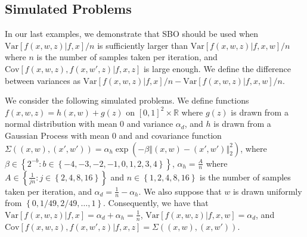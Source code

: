 \documentclass{article}
\newcommand{\w}{w}
\newcommand{\z}{z}
\begin{document}
\subsection{Simulated Problems}
\label{sec:GPexample}

In our last examples, we demonstrate that SBO should be used when $\mbox{Var}\left[f\left(x,\w,\z\right)|f,x\right]/n$ is sufficiently larger than $\mbox{Var}\left[f\left(x,\w,\z\right)|f,x,\w\right]/n$ where $n$ is the number of samples taken per iteration, and $\mbox{Cov}\left[f\left(x,\w,\z\right),f\left(x,\w',\z\right)|f,x,z\right]$ is large enough. We define the difference between variances as $\mbox{Var}\left[f\left(x,\w,\z\right)|f,x\right]/n - \mbox{Var}\left[f\left(x,\w,\z\right)|f,x,\w\right]/n$.

We consider the following simulated problems. We define functions $f(x,\w,\z)=h(x,\w)+g(\z)$ on $\left[0,1\right]^{2}\times\mathbb{R}$ where $g(z)$ is drawn from a normal distribution with mean $0$ and variance $\alpha_{d}$, and $h$ is drawn from a Gaussian Process with mean $0$ and and covariance function $\Sigma\left(\left(x,\w\right),\left(x',\w'\right)\right)=\alpha_{h}\exp\left(-\beta\left\Vert \left(x,\w\right)-\left(x',\w'\right)\right\Vert _{2}^{2}\right)$, where $\beta\in\left\{ 2^{-b}:b\in\left\{ -4,-3,-2,-1,0,1,2,3,4\right\} \right\} $, $\alpha_{h}=\frac{A}{n}$ where $A\in\left\{ \frac{1}{jn}:j\in\left\{ 2,4,8,16\right\} \right\} $ and $n\in\left\{ 1,2,4,8,16\right\} $ is the number of samples taken per iteration, and $\alpha_{d}=\frac{1}{n}-\alpha_{h}$. We also suppose that 
$\w$ is drawn uniformly from $\left\{ 0,1/49,2/49,\ldots,1\right\} $. Consequently, we have that $\mbox{Var}\left[f\left(x,\w,\z\right)|f,x\right]=\alpha_{d}+\alpha_{h}=\frac{1}{n}$, $\mbox{Var}\left[f\left(x,\w,\z\right)|f,x,\w\right]=\alpha_{d}$, and $\mbox{Cov}\left[f\left(x,\w,\z\right),f\left(x,\w',\z\right)|f,x,z\right]=\Sigma\left(\left(x,\w\right),\left(x,\w'\right)\right)$.
\end{document}

